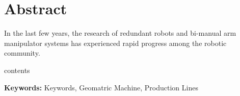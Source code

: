\chapter*{Abstract}
\setlength{\parindent}{2pc}
\noindent In the last few years, the research of redundant robots and bi-manual arm manipulator systems has experienced rapid progress among the robotic community. 

contents

\vskip 0.75cm
\noindent\textbf{Keywords:} Keywords, Geomatric Machine, Production Lines